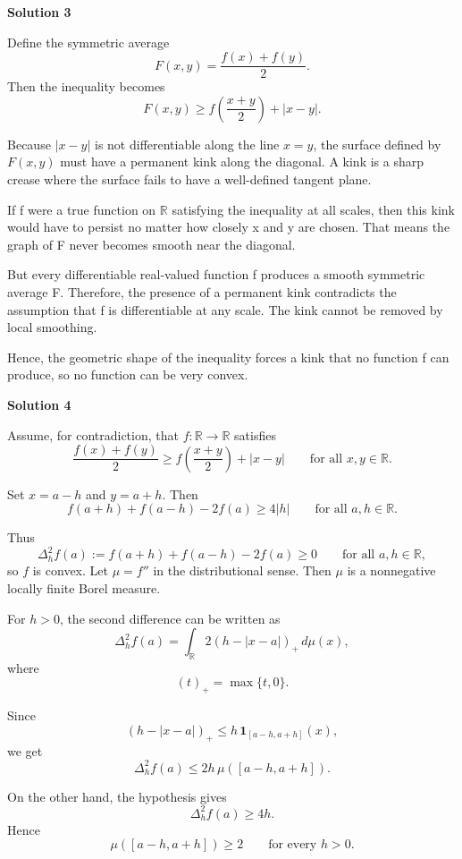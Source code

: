 \begin{enumerate}
 



\textbf{Solution 3}

Define the symmetric average
 \[F(x, y) = \frac{f(x) + f(y)}{2}.\]Then the inequality becomes
 \[F(x, y) \ge f\left( \frac{x + y}{2} \right) + |x - y|.\]

 Because $|x - y|$ is not differentiable along the line $x = y$, the surface defined by $F(x, y)$ must have a permanent kink along the diagonal. A kink is a sharp crease where the surface fails to have a well-defined tangent plane.

 If f were a true function on $\mathbb{R}$ satisfying the inequality at all scales, then this kink would have to persist no matter how closely x and y are chosen. That means the graph of F never becomes smooth near the diagonal.

 But every differentiable real-valued function f produces a smooth symmetric average F. Therefore, the presence of a permanent kink contradicts the assumption that f is differentiable at any scale. The kink cannot be removed by local smoothing.

 Hence, the geometric shape of the inequality forces a kink that no function f can produce, so no function can be very convex.

 



\textbf{Solution 4}

Assume, for contradiction, that $f:\mathbb{R}\to\mathbb{R}$ satisfies
 \[\frac{f(x)+f(y)}{2}\geq f\!\left(\frac{x+y}{2}\right)+|x-y| \qquad \text{for all } x,y\in\mathbb{R}.\]

 Set $x=a-h$ and $y=a+h$. Then
 \[f(a+h)+f(a-h)-2f(a)\geq 4|h| \qquad \text{for all } a,h\in\mathbb{R}.\]

 Thus
 \[\Delta_h^2 f(a):=f(a+h)+f(a-h)-2f(a)\geq 0 \qquad \text{for all } a,h\in\mathbb{R},\]so $f$ is convex. Let $\mu=f''$ in the distributional sense. Then $\mu$ is a nonnegative locally finite Borel measure.

 For $h>0$, the second difference can be written as
 \[\Delta_h^2 f(a)=\int_{\mathbb{R}} 2(h-|x-a|)_+\,d\mu(x),\]where
 \[(t)_+=\max\{t,0\}.\]

 Since
 \[(h-|x-a|)_+\leq h\,\mathbf{1}_{[a-h,a+h]}(x),\]we get
 \[\Delta_h^2 f(a)\leq 2h\,\mu([a-h,a+h]).\]

 On the other hand, the hypothesis gives
 \[\Delta_h^2 f(a)\geq 4h.\]Hence
 \[\mu([a-h,a+h])\geq 2 \qquad \text{for every } h>0.\]


\end{enumerate}
